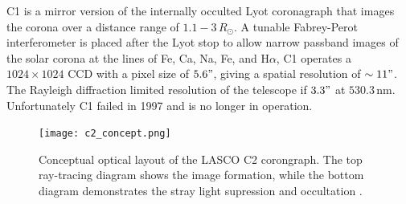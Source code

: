 C1 is a mirror version of the internally occulted Lyot coronagraph that images the corona over a distance range of $1.1- 3\,R_{\odot}$. A tunable Fabrey-Perot interferometer is placed after the Lyot stop to allow narrow passband images of the solar corona at the lines of Fe, Ca, Na, Fe, and H$\alpha$,
C1 operates a $1024\times1024$ CCD with a pixel size of $5.6"$, giving a spatial resolution of $\sim11"$. The Rayleigh diffraction limited resolution of the telescope if $3.3"$ at $530.3$\,nm. Unfortunately C1 failed in 1997 and is no longer in operation. 
\begin{figure}[!t]
\begin{center}
\texttt{[image: c2\_concept.png]}
\caption[The LASCO C2 coronagraph optics]{Conceptual optical layout of the LASCO C2 corongraph. The top ray-tracing diagram shows the image formation, while the bottom diagram demonstrates the stray light supression and occultation \citep{bru95}.}
\label{fig:c2_concept}
\end{center}
\end{figure}

